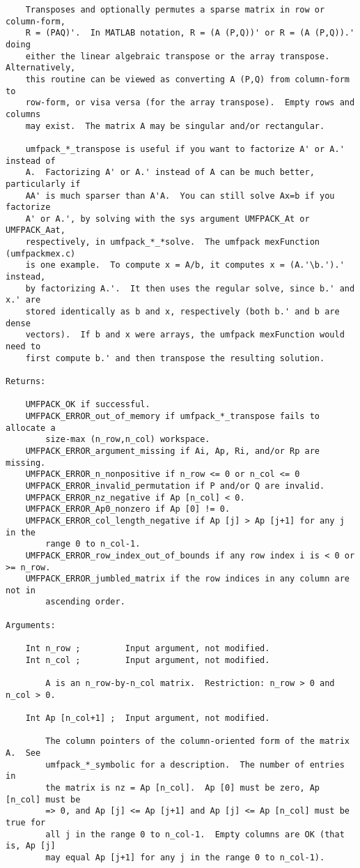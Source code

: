 {\begin{verbatim}
    Transposes and optionally permutes a sparse matrix in row or column-form,
    R = (PAQ)'.  In MATLAB notation, R = (A (P,Q))' or R = (A (P,Q)).' doing
    either the linear algebraic transpose or the array transpose. Alternatively,
    this routine can be viewed as converting A (P,Q) from column-form to
    row-form, or visa versa (for the array transpose).  Empty rows and columns
    may exist.  The matrix A may be singular and/or rectangular.

    umfpack_*_transpose is useful if you want to factorize A' or A.' instead of
    A.  Factorizing A' or A.' instead of A can be much better, particularly if
    AA' is much sparser than A'A.  You can still solve Ax=b if you factorize
    A' or A.', by solving with the sys argument UMFPACK_At or UMFPACK_Aat,
    respectively, in umfpack_*_*solve.  The umfpack mexFunction (umfpackmex.c)
    is one example.  To compute x = A/b, it computes x = (A.'\b.').' instead,
    by factorizing A.'.  It then uses the regular solve, since b.' and x.' are
    stored identically as b and x, respectively (both b.' and b are dense
    vectors).  If b and x were arrays, the umfpack mexFunction would need to
    first compute b.' and then transpose the resulting solution.

Returns:

    UMFPACK_OK if successful.
    UMFPACK_ERROR_out_of_memory if umfpack_*_transpose fails to allocate a
        size-max (n_row,n_col) workspace.
    UMFPACK_ERROR_argument_missing if Ai, Ap, Ri, and/or Rp are missing.
    UMFPACK_ERROR_n_nonpositive if n_row <= 0 or n_col <= 0
    UMFPACK_ERROR_invalid_permutation if P and/or Q are invalid.
    UMFPACK_ERROR_nz_negative if Ap [n_col] < 0.
    UMFPACK_ERROR_Ap0_nonzero if Ap [0] != 0.
    UMFPACK_ERROR_col_length_negative if Ap [j] > Ap [j+1] for any j in the
        range 0 to n_col-1.
    UMFPACK_ERROR_row_index_out_of_bounds if any row index i is < 0 or >= n_row.
    UMFPACK_ERROR_jumbled_matrix if the row indices in any column are not in
        ascending order.

Arguments:

    Int n_row ;         Input argument, not modified.
    Int n_col ;         Input argument, not modified.

        A is an n_row-by-n_col matrix.  Restriction: n_row > 0 and n_col > 0.

    Int Ap [n_col+1] ;  Input argument, not modified.

        The column pointers of the column-oriented form of the matrix A.  See
        umfpack_*_symbolic for a description.  The number of entries in
        the matrix is nz = Ap [n_col].  Ap [0] must be zero, Ap [n_col] must be
        => 0, and Ap [j] <= Ap [j+1] and Ap [j] <= Ap [n_col] must be true for
        all j in the range 0 to n_col-1.  Empty columns are OK (that is, Ap [j]
        may equal Ap [j+1] for any j in the range 0 to n_col-1).


\end{verbatim}}
